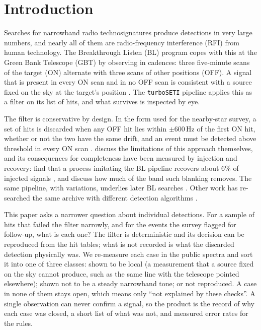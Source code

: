\documentclass[twocolumn]{aastex631}
\begin{document}

\section{Introduction} \label{sec:intro}

Searches for narrowband radio technosignatures \citep{Tarter2001} produce
detections in very large numbers, and nearly all of them are radio-frequency
interference (RFI) from human technology. The Breakthrough Listen (BL)
program \citep{Worden2017,Isaacson2017,MacMahon2018} copes with this at the
Green Bank Telescope (GBT) by observing in cadences: three five-minute scans
of the target (ON) alternate with three scans of other positions (OFF). A
signal that is present in every ON scan and in no OFF scan is consistent
with a source fixed on the sky at the target's position
\citep{Enriquez2017,Price2020}. The \texttt{turboSETI} pipeline
\citep{turboseti} applies this as a filter on its list of hits, and what
survives is inspected by eye.

The filter is conservative by design. In the form used for the nearby-star
survey, a set of hits is discarded when any OFF hit lies within
$\pm600$\,Hz of the first ON hit, whether or not the two have the same
drift, and an event must be detected above threshold in every ON scan
\citep{Price2020}. \citet{Price2020} discuss the limitations of this
approach themselves, and its consequences for completeness have been
measured by injection and recovery: \citet{Margot2023} find that a process
imitating the BL pipeline recovers about 6\% of injected signals
\citep[see also][]{Margot2021}, and \citet{Pinchuk2019} discuss how much of
the band such blanking removes. The
same pipeline, with variations, underlies later BL searches
\citep[e.g.,][]{Gajjar2021,Choza2024}. Other work has re-searched the same
archive with different detection algorithms
\citep{Ma2023,Painter2025,JacobsonBell2025}.

This paper asks a narrower question about individual detections. For a
sample of hits that failed the filter narrowly, and for the events the
survey flagged for follow-up, what is each one? The filter is deterministic
and its decision can be reproduced from the hit tables; what is not recorded
is what the discarded detection physically was. We re-measure each case in
the public spectra and sort it into one of three classes: shown to be local
(a measurement that a source fixed on the sky cannot produce, such as the
same line with the telescope pointed elsewhere); shown not to be a steady
narrowband tone; or not reproduced. A case in none of them stays open, which
means only ``not explained by these checks''. A single observation can never
confirm a signal, so the product is the record of why each case was closed,
a short list of what was not, and measured error rates for the rules.
\end{document}
